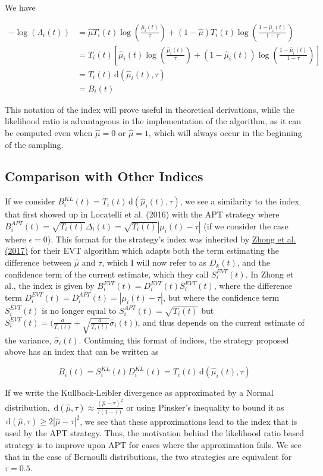 \documentclass[12pt,]{article}
\newcommand{\der}{\,\text{d}}
\begin{document}
We have

\begin{align*}
-\log(\Lambda_i(t)) & = \hat{\mu}T_i(t) \log(\frac{\hat{\mu}_i(t)}{\tau}) + (1-\hat{\mu})T_i(t) \log(\frac{1-\hat{\mu}_i(t)}{1-\tau}) \\
& = T_i(t) [\hat{\mu}_i(t) \log(\frac{\hat{\mu}_i(t)}{\tau}) + (1-\hat{\mu}_i(t)) \log(\frac{1-\hat{\mu}_i(t)}{1-\tau})] \\
& = T_i(t) \der(\hat{\mu}_i(t), \tau) \\
& = B_i(t)
\end{align*}

This notation of the index will prove useful in theoretical derivations,
while the likelihood ratio is advantageous in the implementation of the
algorithm, as it can be computed even when \(\hat{\mu}=0\) or
\(\hat{\mu}=1\), which will always occur in the beginning of the
sampling.

\subsection{Comparison with Other
Indices}\label{comparison-with-other-indices}

If we consider \(B_i^{KL}(t) = T_i(t) \der(\hat{\mu}_i(t), \tau)\), we
see a similarity to the index that first showed up in Locatelli et al.
(2016) with the APT strategy where
\(B^{APT}_i(t) = \sqrt{T_i(t)} \Delta_i(t) = \sqrt{T_i(t)} |\mu_i(t) - \tau|\)
(if we consider the case where \(\epsilon = 0\)). This format for the
strategy's index was inherited by
\href{https://arxiv.org/pdf/1704.04567.pdf}{Zhong et al. (2017)} for
their EVT algorithm which adapts both the term estimating the difference
between \(\hat{\mu}\) and \(\tau\), which I will now refer to as
\(D_k(t)\), and the confidence term of the current estimate, which they
call \(S_i^{EVT}(t)\). In Zhong et al., the index is given by
\(B_i^{EVT}(t) = D_i^{EVT}(t)S^{EVT}_i(t)\), where the difference term
\(D_i^{EVT}(t) = D_i^{APT}(t) = |\mu_i(t) - \tau|\), but where the
confidence term \(S_i^{EVT}(t)\) is no longer equal to
\(S_i^{APT}(t)=\sqrt{T_i(t)}\) but
\(S_i^{EVT}(t) = \Big(\frac{a}{T_i(t)} + \sqrt{\frac{a}{T_i(t)}}\hat{\sigma}_i(t)\Big)\),
and thus depends on the current estimate of the variance,
\(\hat{\sigma}_i(t)\). Continuing this format of indices, the strategy
proposed above has an index that can be written as

\[
B_i(t) = S^{KL}_i(t) D_i^{KL}(t) = T_i(t) \der(\hat{\mu}_i(t), \tau)
\]

If we write the Kullback-Leibler divergence as approximated by a Normal
distribution,
\(\der(\hat{\mu}, \tau) \approx \frac{(\hat{\mu}-\tau)^2}{\tau(1-\tau)}\)
or using Pinsker's inequality to bound it as
\(\der(\hat{\mu}, \tau) \geq 2|\hat{\mu}-\tau|^2\), we see that these
approximations lead to the index that is used by the APT strategy. Thus,
the motivation behind the likelihood ratio based strategy is to improve
upon APT for cases where the approximation fails. We see that in the
case of Bernoulli distributions, the two strategies are equivalent for
\(\tau = 0.5\).
\end{document}
